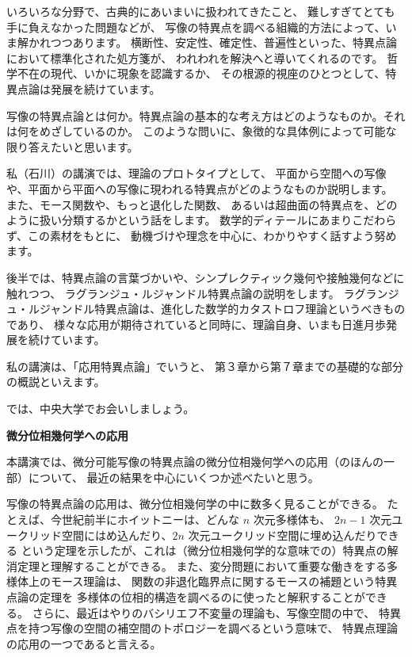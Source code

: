 \documentclass[uplatex,dvipdfmx]{jlreq}
\begin{document}
\medskip

いろいろな分野で、古典的にあいまいに扱われてきたこと、
難しすぎてとても手に負えなかった問題などが、
写像の特異点を調べる組織的方法によって、いま解かれつつあります。
横断性、安定性、確定性、普遍性といった、特異点論において標準化された処方箋が、
われわれを解決へと導いてくれるのです。
哲学不在の現代、いかに現象を認識するか、
その根源的視座のひとつとして、特異点論は発展を続けています。

写像の特異点論とは何か。特異点論の基本的な考え方はどのようなものか。それは何をめざしているのか。
このような問いに、象徴的な具体例によって可能な限り答えたいと思います。

私（石川）の講演では、理論のプロトタイプとして、
平面から空間への写像や、平面から平面への写像に現われる特異点がどのようなものか説明します。
また、モース関数や、もっと退化した関数、
あるいは超曲面の特異点を、どのように扱い分類するかという話をします。
数学的ディテールにあまりこだわらず、この素材をもとに、
動機づけや理念を中心に、わかりやすく話すよう努めます。

後半では、特異点論の言葉づかいや、シンプレクティック幾何や接触幾何などに触れつつ、
ラグランジュ・ルジャンドル特異点論の説明をします。
ラグランジュ・ルジャンドル特異点論は、進化した数学的カタストロフ理論というべきものであり、
様々な応用が期待されていると同時に、理論自身、いまも日進月歩発展を続けています。

私の講演は、「応用特異点論」でいうと、
第３章から第７章までの基礎的な部分の概説といえます。

では、中央大学でお会いしましょう。

\newpage

\begin{center}
{\large\bfseries 微分位相幾何学への応用}

\hspace*{\fill}{\large\bfseries 佐伯 修（広島大・理）}
\end{center}

\medskip

本講演では、微分可能写像の特異点論の微分位相幾何学への応用（のほんの一部）について、
最近の結果を中心にいくつか述べたいと思う。

写像の特異点論の応用は、微分位相幾何学の中に数多く見ることができる。
たとえば、今世紀前半にホイットニーは、どんな $n$ 次元多様体も、
$2n-1$ 次元ユークリッド空間にはめ込んだり、$2n$ 次元ユークリッド空間に埋め込んだりできる
という定理を示したが、これは（微分位相幾何学的な意味での）特異点の解消定理と理解することができる。
また、変分問題において重要な働きをする多様体上のモース理論は、
関数の非退化臨界点に関するモースの補題という特異点論の定理を
多様体の位相的構造を調べるのに使ったと解釈することができる。
さらに、最近はやりのバシリエフ不変量の理論も、写像空間の中で、
特異点を持つ写像の空間の補空間のトポロジーを調べるという意味で、
特異点理論の応用の一つであると言える。
\end{document}
